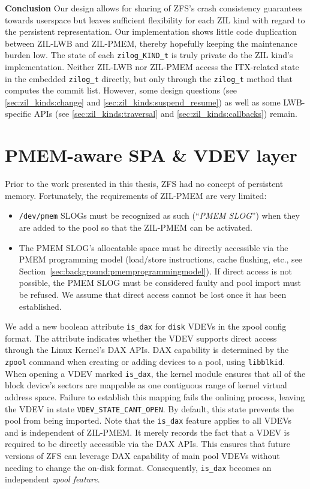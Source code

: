 \documentclass[12pt,a4paper,twoside]{book}
\begin{document}
\textbf{Conclusion}
Our design allows for sharing of ZFS's crash consistency guarantees towards userspace but leaves sufficient flexibility for each ZIL kind with regard to the persistent representation.
Our implementation shows little code duplication between ZIL-LWB and ZIL-PMEM, thereby hopefully keeping the maintenance burden low.
The state of each \lstinline{zilog_KIND_t} is truly private do the ZIL kind's implementation.
Neither ZIL-LWB nor ZIL-PMEM access the ITX-related state in the embedded \lstinline{zilog_t} directly, but only through the \lstinline{zilog_t} method that computes the commit list.
However, some design questions (see \ref{sec:zil_kinds:change} and \ref{sec:zil_kinds:suspend_resume}) as well as some LWB-specific APIs (see \ref{sec:zil_kinds:traversal} and \ref{sec:zil_kinds:callbacks}) remain.

\section{PMEM-aware SPA \& VDEV layer}\label{sec:pmemspavdev}
Prior to the work presented in this thesis, ZFS had no concept of persistent memory.
Fortunately, the requirements of ZIL-PMEM are very limited:
\begin{itemize}[noitemsep]
    \item \texttt{/dev/pmem} SLOGs must be recognized as such (``\textit{PMEM SLOG}'') when they are added to the pool so that the ZIL-PMEM can be activated.
    \item The PMEM SLOG's allocatable space must be directly accessible via the PMEM programming model (load/store instructions, cache flushing, etc., see Section~\ref{sec:background:pmemprogrammingmodel}).
        If direct access is not possible, the PMEM SLOG must be considered faulty and pool import must be refused.
        We assume that direct access cannot be lost once it has been established.
\end{itemize}

We add a new boolean attribute \lstinline{is_dax} for \lstinline{disk} VDEVs in the zpool config format.
The attribute indicates whether the VDEV supports direct access through the Linux Kernel's DAX APIs.
DAX capability is determined by the \lstinline{zpool} command when creating or adding devices to a pool, using \lstinline{libblkid}.
When opening a VDEV marked \lstinline{is_dax}, the kernel module ensures that all of the block device's sectors are mappable as one contiguous range of kernel virtual address space.
Failure to establish this mapping fails the onlining process, leaving the VDEV in state \lstinline{VDEV_STATE_CANT_OPEN}.
By default, this state prevents the pool from being imported.
Note that the \lstinline{is_dax} feature applies to all VDEVs and is independent of ZIL-PMEM.
It merely records the fact that a VDEV is required to be directly accessible via the DAX APIs.
This ensures that future versions of ZFS can leverage DAX capability of main pool VDEVs without needing to change the on-disk format.
Consequently, \lstinline{is_dax} becomes an independent \textit{zpool feature}.
\end{document}
